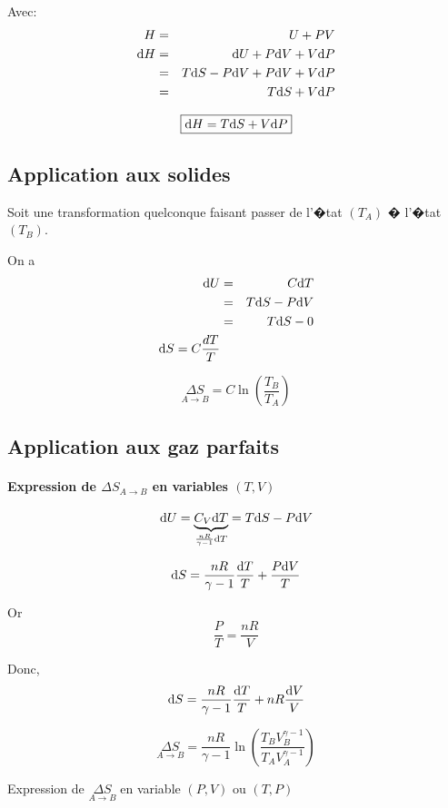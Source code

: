 Avec:
\begin{eqnarray*}
	H 	& = & U + PV\\
	\mathrm{d} H 	& = & \mathrm{d} U + P \mathrm{d} V + V \mathrm{d} P \\
		& = & T \mathrm{d} S - P \mathrm{d} V + P \mathrm{d} V + V \mathrm{d} P\\
		& = & T \mathrm{d} S + V \mathrm{d} P
\end{eqnarray*}

\[
	\boxed{\mathrm{d} H = T \mathrm{d} S + V \mathrm{d} P}
\]


\subsection{Application aux solides}
Soit une transformation quelconque faisant passer de l'�tat $(T_A)$ � l'�tat $(T_B)$.

On a
\begin{eqnarray*}
	 \mathrm{d} U	& = & C\mathrm{d} T\\
	 	& = & T \mathrm{d} S - P\mathrm{d} V \\
	 	& = & T\mathrm{d} S - 0 \\
	\mathrm{d} S = C \frac{dT}{T}
\end{eqnarray*}


\[
	\boxed{\underset{A \rightarrow B}{\Delta S} = C \ln \left( \frac{T_B}{T_A} \right)}
\]

\subsection{Application aux gaz parfaits}

\paragraph{Expression de $ \Delta S_{A \to B} $ en variables $ (T, V) $}

\[
	\mathrm{d} U = \underbrace{C_V \mathrm{d} T}_{ \frac{nR}{\gamma - 1} \mathrm{d} T} = T\mathrm{d} S - P\mathrm{d} V
\]

\[
	\mathrm{d} S = \frac{nR}{\gamma - 1} \frac{\mathrm{d} T}{T} + \frac{P \mathrm{d} V}{T}
\]

Or
\[
	\frac{P}{T} = \frac{nR}{V}
\]

Donc,
\[
	\mathrm{d} S = \frac{nR}{\gamma - 1} \frac{\mathrm{d} T}{T} + nR \frac{\mathrm{d} V}{V}
\]

\[
	\boxed{\underset{A \to B}{\Delta S} = 
	\frac{nR}{\gamma - 1} \ln\left(\frac{T_B V_B^{\gamma - 1}}{T_A V_A^{\gamma - 1}}\right)}
\]

Expression de $\underset{A \to B}{\Delta S}$ en variable $ (P, V) $ ou $ (T, P) $
